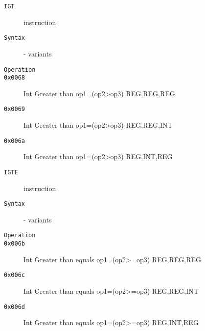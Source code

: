 \clearpage
\begin{description}
\item[\texttt{IGT}] instruction\\
\item[\texttt{Syntax}] - variants\\

\item[\texttt{Operation}]
\item[\texttt{}]
\item[\texttt{0x0068}] Int Greater than op1=(op2>op3)  {REG,REG,REG}       \\
\item[\texttt{0x0069}] Int Greater than op1=(op2>op3)  {REG,REG,INT}       \\
\item[\texttt{0x006a}] Int Greater than op1=(op2>op3)  {REG,INT,REG}       \\
\end{description}
\clearpage
\begin{description}
\item[\texttt{IGTE}] instruction\\
\item[\texttt{Syntax}] - variants\\

\item[\texttt{Operation}]
\item[\texttt{}]
\item[\texttt{0x006b}] Int Greater than equals op1=(op2>=op3)  {REG,REG,REG}       \\
\item[\texttt{0x006c}] Int Greater than equals op1=(op2>=op3)  {REG,REG,INT}       \\
\item[\texttt{0x006d}] Int Greater than equals op1=(op2>=op3)  {REG,INT,REG}       \\
\end{description}
